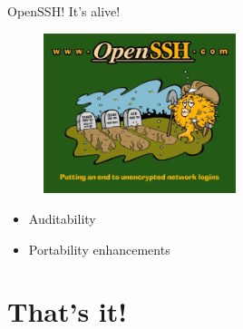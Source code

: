 \documentclass[10pt, compress, aspectratio=169]{beamer}
\begin{document}
\begin{frame}{OpenSSH! It's alive!}
  \begin{figure}[ht]
    \centering
    \includegraphics[width=0.5\textwidth, keepaspectratio=true]{images/openssh.jpg}
  \end{figure}
  \begin{itemize}
    \item Auditability
    \item Portability enhancements
  \end{itemize}
\end{frame}

\section{That's it!}
\begin{frame}[standout]
   \begin{center}\ccbysa\end{center}
\end{frame}

\maketitle
\end{document}
